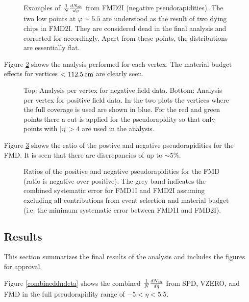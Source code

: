 \documentclass[11pt]{article}
\begin{document}
\begin{figure}
  \centering
  \caption{Examples of $\dndphi$ from FMD2I (negative
    pseudorapidities). The two low points at $\varphi \sim 5.5$ are
    understood as the result of two dying chips in FMD2I. They are
    considered dead in the final analysis and corrected for
    accordingly. Apart from these points, the distributions are
    essentially flat.}
  \label{dndphi_neg}
\end{figure} 

Figure \ref{pervertex} shows the analysis performed for each
vertex. The material budget effects for vertices $<\cm{112.5}$ are
clearly seen.

\begin{figure}
  \centering
  \caption{Top: Analysis per vertex for negative field data. Bottom:
    Analysis per vertex for positive field data. In the two plots the
    vertices where the full coverage is used are shown in blue. For
    the red and green points there a cut is applied for the
    pseudorapidity so that only points with $|\eta|>4$ are used in the
    analysis.}
\label{pervertex}
\end{figure} 

Figure \ref{leftright} shows the ratio of the postive and negative
pseudorapidities for the FMD. It is seen that there are discrepancies
of up to $\sim 5 \%$.
\begin{figure}
  \centering
  \caption{Ratios of the positive and negative pseudorapidities for
    the FMD (ratio is negative over positive). The grey band indicates
    the combined systematic error for FMD1I and FMD2I assuming
    excluding all contributions from event selection and material
    budget (i.e. the minimum systematic error between FMD1I and
    FMD2I).}  \label{leftright}
\end{figure} 

\subsection{Results}

This section summarizes the final results of the analysis and includes
the figures for approval.

Figure \ref{combineddndeta} shows the combined $\dndeta$ from SPD,
VZERO, and FMD in the full pseudorapidity range of $-5<\eta<5.5$.
\end{document}
